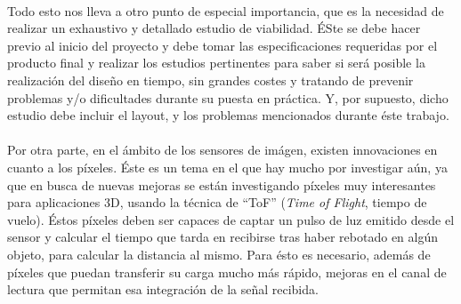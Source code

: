 \paragraph{}
Todo esto nos lleva a otro punto de especial importancia, que es la necesidad de
realizar un exhaustivo y detallado estudio de viabilidad. ÉSte se debe hacer
previo al inicio del proyecto y debe tomar las especificaciones requeridas por el
producto final y realizar los estudios pertinentes para saber si será posible la
realización del diseño en tiempo, sin grandes costes y tratando de prevenir problemas
y/o dificultades durante su puesta en práctica. Y, por supuesto, dicho estudio debe
incluir el layout, y los problemas mencionados durante éste trabajo.

\paragraph{}
Por otra parte, en el ámbito de los sensores de imágen, existen innovaciones en
cuanto a los píxeles. Éste es un tema en el que hay mucho por investigar aún, ya
que en busca de nuevas mejoras se están investigando píxeles muy interesantes para
aplicaciones 3D, usando la técnica de ``ToF'' (\textit{Time of Flight},
tiempo de vuelo)\cite{Portaluppi2018}\cite{Payne2014}.
Éstos píxeles deben ser capaces de captar un pulso de luz emitido desde el sensor
y calcular el tiempo que tarda en recibirse tras haber rebotado en algún objeto,
para calcular la distancia al mismo. Para ésto es necesario, además de píxeles
que puedan transferir su carga mucho más rápido, mejoras en el canal de lectura
que permitan esa integración de la señal recibida.

